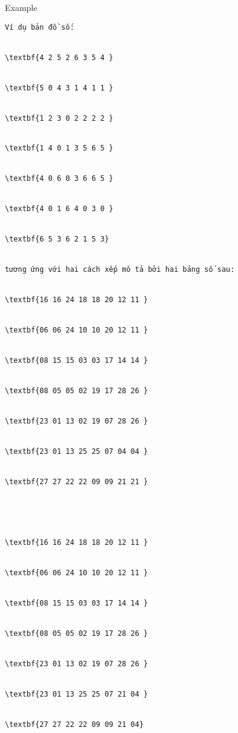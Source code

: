 Example
\begin{verbatim}
Ví dụ bản đồ số:


\textbf{4 2 5 2 6 3 5 4 }


\textbf{5 0 4 3 1 4 1 1 }


\textbf{1 2 3 0 2 2 2 2 }


\textbf{1 4 0 1 3 5 6 5 }


\textbf{4 0 6 0 3 6 6 5 }


\textbf{4 0 1 6 4 0 3 0 }


\textbf{6 5 3 6 2 1 5 3} 


tương ứng với hai cách xếp mô tả bởi hai bảng số sau:


\textbf{16 16 24 18 18 20 12 11 }


\textbf{06 06 24 10 10 20 12 11 }


\textbf{08 15 15 03 03 17 14 14 }


\textbf{08 05 05 02 19 17 28 26 }


\textbf{23 01 13 02 19 07 28 26 }


\textbf{23 01 13 25 25 07 04 04 }


\textbf{27 27 22 22 09 09 21 21 }





\textbf{16 16 24 18 18 20 12 11 }


\textbf{06 06 24 10 10 20 12 11 }


\textbf{08 15 15 03 03 17 14 14 }


\textbf{08 05 05 02 19 17 28 26 }


\textbf{23 01 13 02 19 07 28 26 }


\textbf{23 01 13 25 25 07 21 04 }


\textbf{27 27 22 22 09 09 21 04}\end{verbatim}